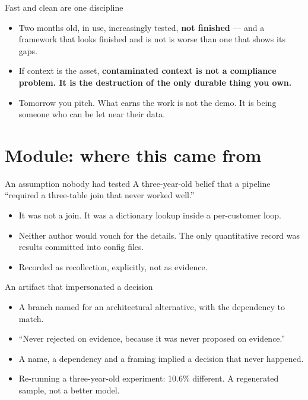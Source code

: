 \documentclass[aspectratio=169,t]{beamer}
\newif\ifmodules
\begin{document}
\begin{frame}{Fast and clean are one discipline}
    \begin{itemize}
        \item Two months old, in use, increasingly tested, \textbf{not finished}
              --- and a framework that looks finished and is not is worse than one
              that shows its gaps.
        \item If context is the asset, \textbf{contaminated context is not a
              compliance problem. It is the destruction of the only durable thing
              you own.}
        \item Tomorrow you pitch. What earns the work is not the demo. It is being
              someone who can be let near their data.
    \end{itemize}
\end{frame}

\ifmodules
\appendix

\section{Module: where this came from}

\begin{frame}{An assumption nobody had tested}
    A three-year-old belief that a pipeline ``required a three-table join that
    never worked well.''
    \begin{itemize}
        \item It was not a join. It was a dictionary lookup inside a per-customer loop.
        \item Neither author would vouch for the details. The only quantitative
              record was results committed into config files.
        \item Recorded as recollection, explicitly, not as evidence.
    \end{itemize}
\end{frame}

\begin{frame}{An artifact that impersonated a decision}
    \begin{itemize}
        \item A branch named for an architectural alternative, with the dependency
              to match.
        \item ``Never rejected on evidence, because it was never proposed on evidence.''
        \item A name, a dependency and a framing implied a decision that never happened.
        \item Re-running a three-year-old experiment: 10.6\% different. A
              regenerated sample, not a better model.
    \end{itemize}
\end{frame}
\end{document}
